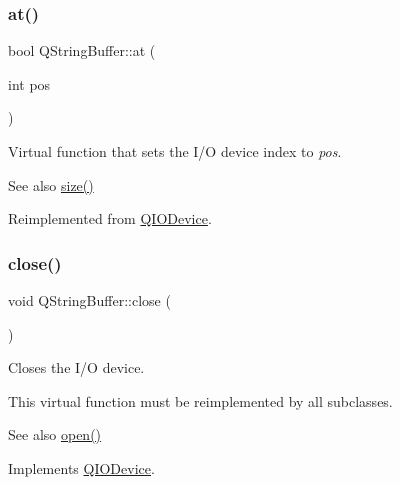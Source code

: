 \subsubsection{\texorpdfstring{at()}{at()}\hspace{0.1cm}{\footnotesize\ttfamily [2/2]}}
{\footnotesize\ttfamily bool Q\+String\+Buffer\+::at (\begin{DoxyParamCaption}\item[{int}]{pos }\end{DoxyParamCaption})\hspace{0.3cm}{\ttfamily [virtual]}}

Virtual function that sets the I/O device index to {\itshape pos}. \begin{DoxySeeAlso}{See also}
\mbox{\hyperlink{class_q_string_buffer_a914433284831ecca2b30f80a642d175e}{size()}} 
\end{DoxySeeAlso}


Reimplemented from \mbox{\hyperlink{class_q_i_o_device_a14643fc1c2e05c2addd1ecc03bd98017}{Q\+I\+O\+Device}}.

\mbox{\label{class_q_string_buffer_aabc8736ce1f90cd66212c5a6b2e166ea}} 
\subsubsection{\texorpdfstring{close()}{close()}}
{\footnotesize\ttfamily void Q\+String\+Buffer\+::close (\begin{DoxyParamCaption}{ }\end{DoxyParamCaption})\hspace{0.3cm}{\ttfamily [virtual]}}

Closes the I/O device.

This virtual function must be reimplemented by all subclasses.

\begin{DoxySeeAlso}{See also}
\mbox{\hyperlink{class_q_string_buffer_a593d2870764f6888dd1aabea55304a46}{open()}} 
\end{DoxySeeAlso}


Implements \mbox{\hyperlink{class_q_i_o_device_a01a9ddac5d964b5b6a1f10005bf28a4f}{Q\+I\+O\+Device}}.

\mbox{\label{class_q_string_buffer_a2961ddd6de68bb9e681ae8e18b6b298b}} 
